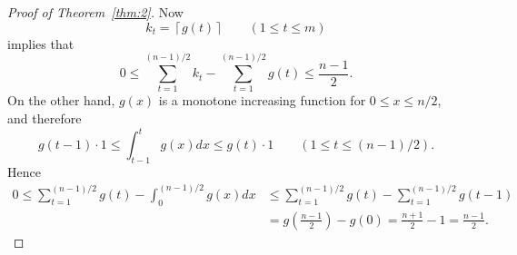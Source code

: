 \documentclass[11pt]{amsart}
\numberwithin{equation}{section}
\begin{document}
\begin{proof}[Proof of Theorem~\ref{thm:2}]
Now 
\[
    k_t  
    = \left\lceil g(t) \right\rceil
    \qquad (1 \le t \le m)
\]
implies that
\begin{equation}\label{eq:odd_error1}
    0 
    \le \sum_{t=1}^{(n-1)/2} k_t  - \sum_{t=1}^{(n-1)/2} g(t)
    \le \frac{n-1}{2}.    
\end{equation}
On the other hand, $g(x)$ is a monotone increasing function for $0\le x\le n/2$, and therefore 
\[
    g(t-1) \cdot 1 
    \le \int_{t-1}^{t} g(x)dx
    \le g(t)\cdot 1
    \qquad (1 \le t \le (n-1)/2).
\]
Hence 
\begin{align}\label{eq:odd_error2}
    0
    \le \sum_{t=1}^{(n-1)/2} g(t) - \int_0^{(n-1)/2} g(x)dx
    &\le \sum_{t=1}^{(n-1)/2} g(t) - \sum_{t=1}^{(n-1)/2} g(t-1) \\
    &= g\left( \frac{n-1}{2} \right) - g(0)
    = \frac{n+1}{2} - 1
    = \frac{n-1}{2}.
    \nonumber
\end{align}

\end{proof}
\end{document}
